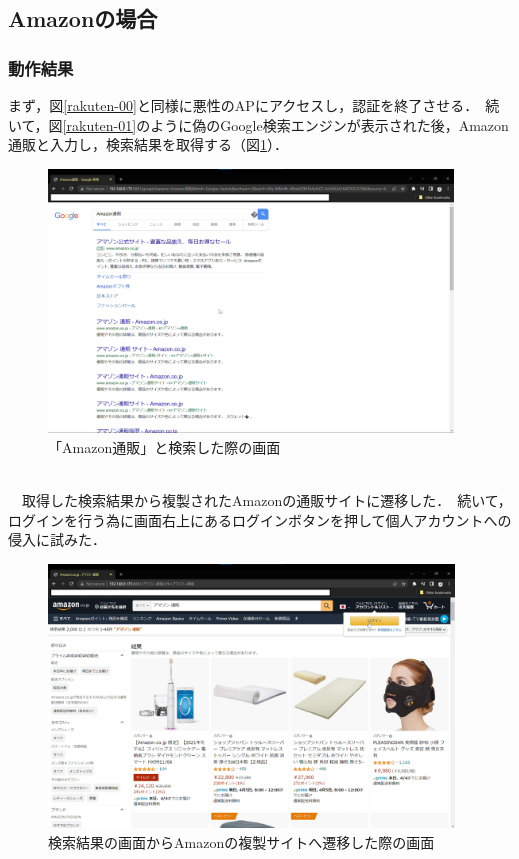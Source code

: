 \documentclass[dvipdfmx]{jsarticle}
\begin{document}
            \subsection{Amazonの場合}
                \subsubsection{動作結果}
                    まず，図\ref{rakuten-00}と同様に悪性のAPにアクセスし，認証を終了させる．\
                    続いて，図\ref{rakuten-01}のように偽のGoogle検索エンジンが表示された後，Amazon通販と入力し，検索結果を取得する（図\ref{amazon-00}）．\
                    \begin{figure}[pth]
                        \centering
                        \includegraphics[height=7cm]{img/amazon/amazon-00.png}
                        \caption{「Amazon通販」と検索した際の画面}
                        \label{amazon-00}
                    \end{figure}
                    \\
                    　取得した検索結果から複製されたAmazonの通販サイトに遷移した．\
                    続いて，ログインを行う為に画面右上にあるログインボタンを押して個人アカウントへの侵入に試みた．\
                    \begin{figure}[pth]
                        \centering
                        \includegraphics[height=7cm]{img/amazon/amazon-01.png}
                        \caption{検索結果の画面からAmazonの複製サイトへ遷移した際の画面}
                        \label{amazon-01}
                    \end{figure}
\end{document}
